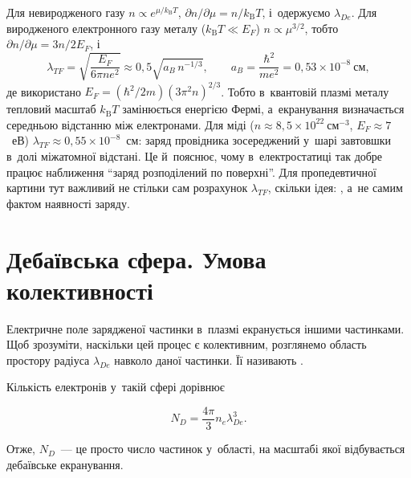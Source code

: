 Для невиродженого газу $n\propto e^{\mu/k_{\mathrm B}T}$, $\partial
n/\partial\mu=n/k_{\mathrm B}T$, і~одержуємо $\lambda_{De}$. Для виродженого електронного
газу металу ($k_{\mathrm B}T\ll E_F$) $n\propto\mu^{3/2}$, тобто $\partial
n/\partial\mu=3n/2E_F$, і
\begin{equation}\label{eq:thomas-fermi}
	\lambda_{TF}=\sqrt{\frac{E_F}{6\pi ne^2}}\approx0{,}5\sqrt{a_B\,n^{-1/3}},\qquad a_B=\frac{\hbar^2}{me^2}=0{,}53\times10^{-8}~\text{см},
\end{equation}
де використано $E_F=(\hbar^2/2m)(3\pi^2n)^{2/3}$. Тобто в~квантовій плазмі металу тепловий
масштаб $k_{\mathrm B}T$ замінюється енергією Фермі, а~екранування визначається середньою
відстанню між електронами. Для міді ($n\approx8{,}5\times10^{22}~\mathrm{см}^{-3}$,
$E_F\approx7$~еВ) $\lambda_{TF}\approx0{,}55\times10^{-8}$~см: заряд провідника
зосереджений у~шарі завтовшки в~долі міжатомної відстані. Це й~пояснює, чому
в~електростатиці так добре працює наближення \enquote{заряд розподілений по поверхні}. Для
пропедевтичної картини тут важливий не стільки сам розрахунок $\lambda_{TF}$, скільки
ідея: , а~не
самим фактом наявності заряду.



\section{Дебаївська сфера. Умова колективності}



Електричне поле зарядженої частинки в~плазмі екранується іншими частинками. Щоб зрозуміти,
наскільки цей процес є колективним, розглянемо область простору радіуса $\lambda_{De}$
навколо даної частинки. Її називають .

Кількість електронів у~такій сфері дорівнює

\begin{equation}\label{eq:ND}
    N_D=\frac{4\pi}{3}n_e\lambda_{De}^3.
\end{equation}

Отже, $N_D$~--- це просто число частинок у~області, на масштабі якої відбувається
дебаївське екранування.

